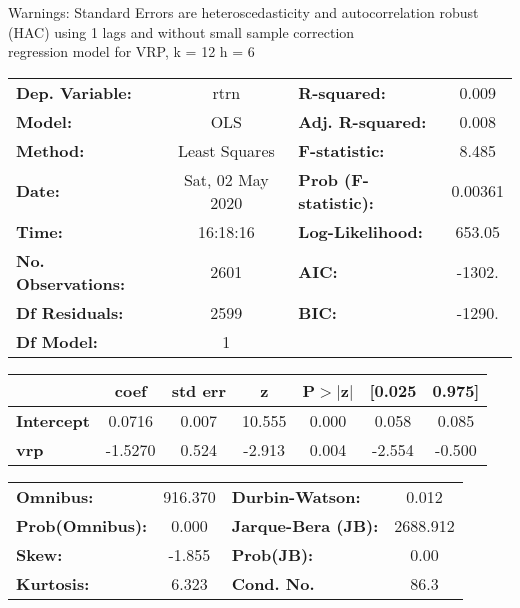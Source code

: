 Warnings: \newline
 [1] Standard Errors are heteroscedasticity and autocorrelation robust (HAC) using 1 lags and without small sample correction\\ 

regression model for VRP, k = 12 h = 6\begin{center}
\begin{tabular}{lclc}
\toprule
\textbf{Dep. Variable:}    &       rtrn       & \textbf{  R-squared:         } &     0.009   \\
\textbf{Model:}            &       OLS        & \textbf{  Adj. R-squared:    } &     0.008   \\
\textbf{Method:}           &  Least Squares   & \textbf{  F-statistic:       } &     8.485   \\
\textbf{Date:}             & Sat, 02 May 2020 & \textbf{  Prob (F-statistic):} &  0.00361    \\
\textbf{Time:}             &     16:18:16     & \textbf{  Log-Likelihood:    } &    653.05   \\
\textbf{No. Observations:} &        2601      & \textbf{  AIC:               } &    -1302.   \\
\textbf{Df Residuals:}     &        2599      & \textbf{  BIC:               } &    -1290.   \\
\textbf{Df Model:}         &           1      & \textbf{                     } &             \\
\bottomrule
\end{tabular}
\begin{tabular}{lcccccc}
                   & \textbf{coef} & \textbf{std err} & \textbf{z} & \textbf{P$> |$z$|$} & \textbf{[0.025} & \textbf{0.975]}  \\
\midrule
\textbf{Intercept} &       0.0716  &        0.007     &    10.555  &         0.000        &        0.058    &        0.085     \\
\textbf{vrp}       &      -1.5270  &        0.524     &    -2.913  &         0.004        &       -2.554    &       -0.500     \\
\bottomrule
\end{tabular}
\begin{tabular}{lclc}
\textbf{Omnibus:}       & 916.370 & \textbf{  Durbin-Watson:     } &    0.012  \\
\textbf{Prob(Omnibus):} &   0.000 & \textbf{  Jarque-Bera (JB):  } & 2688.912  \\
\textbf{Skew:}          &  -1.855 & \textbf{  Prob(JB):          } &     0.00  \\
\textbf{Kurtosis:}      &   6.323 & \textbf{  Cond. No.          } &     86.3  \\
\bottomrule
\end{tabular}
\end{center}

